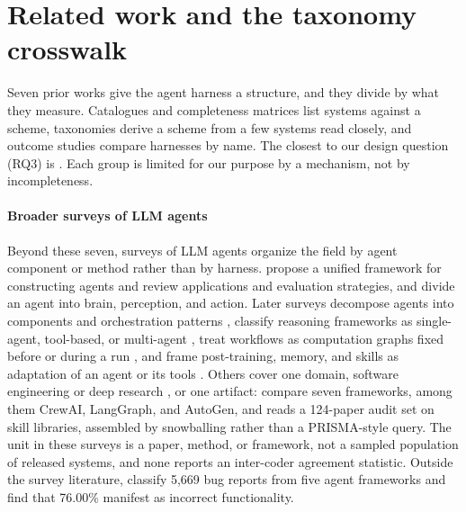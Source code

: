 \section{Related work and the taxonomy crosswalk}
\label{sec:related}

Seven prior works give the agent harness a structure, and they divide by what they measure.
Catalogues and completeness matrices list systems against a scheme, taxonomies derive a scheme from a
few systems read closely, and outcome studies compare harnesses by name. The closest to our design
question (RQ3) is \citet{guo2026qa2task}. Each group is limited for our purpose by a mechanism, not by
incompleteness.

\paragraph{Broader surveys of LLM agents}
Beyond these seven, surveys of LLM agents organize the field by agent component or method rather than
by harness. \citet{wang2023agentsurvey} propose a unified framework for constructing agents and review
applications and evaluation strategies, and \citet{xi2023riseagents} divide an agent into brain,
perception, and action. Later surveys decompose agents into components and orchestration patterns
\citep{agenticai2026taxonomies,agentsystems2026survey}, classify reasoning frameworks as single-agent,
tool-based, or multi-agent \citep{agenticreasoning2025survey}, treat workflows as computation graphs
fixed before or during a run \citep{workflowopt2026survey}, and frame post-training, memory, and skills
as adaptation of an agent or its tools \citep{adaptation2025survey}. Others cover one domain, software
engineering \citep{seagentic2025survey} or deep research \citep{deepresearch2025agents}, or one
artifact: \citet{agenticframeworks2025} compare seven frameworks, among them CrewAI, LangGraph, and
AutoGen, and \citet{skills2026lifecycle} reads a 124-paper audit set on skill libraries, assembled by
snowballing rather than a PRISMA-style query. The unit in these surveys is a paper, method, or
framework, not a sampled population of released systems, and none reports an inter-coder agreement
statistic. Outside the survey literature, \citet{frameworksfallshort2026} classify 5,669 bug reports
from five agent frameworks and find that 76.00\% manifest as incorrect functionality.

